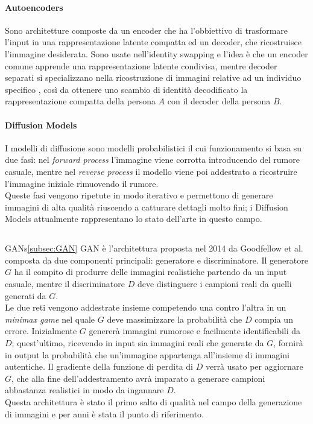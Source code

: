 \paragraph{Autoencoders} Sono architetture composte da un encoder che ha l'obbiettivo di trasformare l'input in una rappresentazione latente compatta ed un decoder, che ricostruisce l'immagine desiderata. Sono usate nell'identity swapping e l'idea è che un encoder comune apprende una rappresentazione latente condivisa, mentre decoder separati si specializzano nella ricostruzione di immagini relative ad un individuo specifico \cite{fernando2025face}
, così da ottenere uno scambio di identità decodificato la rappresentazione compatta della persona $A$ con il decoder della persona $B$.
\paragraph{Diffusion Models} I modelli di diffusione sono modelli probabilistici il cui funzionamento si basa su due fasi: nel \textit{forward process} l'immagine viene corrotta introducendo del rumore casuale, mentre nel \textit{reverse process} il modello viene poi addestrato a ricostruire l'immagine iniziale rimuovendo il rumore.\\
Queste fasi vengono ripetute in modo iterativo e permettono di generare immagini di alta qualità riuscendo a catturare dettagli molto fini; i Diffusion Models attualmente rappresentano lo stato dell'arte in questo campo.
\subsection{}{GANs}\ref{subsec:GAN}
GAN è l'architettura proposta nel 2014 da Goodfellow et al.\cite{goodfellow2014generative} composta da due componenti principali: generatore e discriminatore. Il generatore $G$ ha il compito di produrre delle immagini realistiche partendo da un input casuale, mentre il discriminatore $D$ deve distinguere i campioni reali da quelli generati da $G$.\\
Le due reti vengono addestrate insieme competendo una contro l'altra in un \textit{minimax game} nel quale $G$ deve massimizzare la probabilità che $D$ compia un errore. Inizialmente $G$ genererà immagini rumorose e facilmente identificabili da $D$; quest'ultimo, ricevendo in input sia immagini reali che generate da $G$, fornirà in output la probabilità che un'immagine appartenga all'insieme di immagini autentiche. Il gradiente della funzione di perdita di $D$ verrà usato per aggiornare $G$, che alla fine dell'addestramento avrà imparato a generare campioni abbastanza realistici in modo da ingannare $D$.\\
Questa architettura è stato il primo salto di qualità nel campo della generazione di immagini e per anni è stata  il punto di riferimento.
